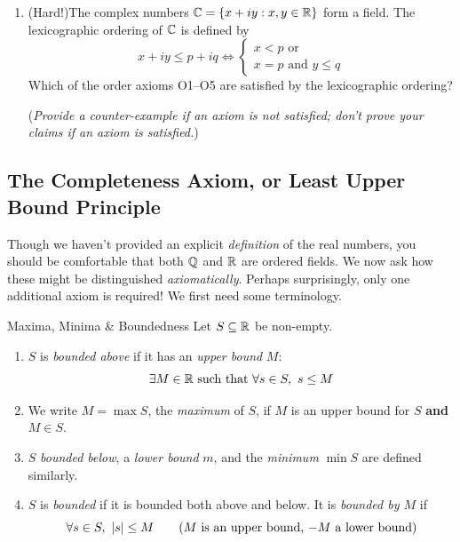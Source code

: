\begin{exercises}{}{}
\begin{enumerate}
	  
	  \item (Hard!)\lstsp The complex numbers $\mathbb{C}=\{x+iy:x,y\in\mathbb{R}\}$ form a field. The lexicographic ordering of $\mathbb{C}$ is defined by
	  \[
	  	x+iy\le p+iq\iff
	  	\begin{cases}
	  		x<p\text{ or}\\
	  		x=p\text{ and }y\le q
	  	\end{cases}
	  \]
	  Which of the order axioms O1--O5 are satisfied by the lexicographic ordering?\par
	  (\emph{Provide a counter-example if an axiom is not satisfied; don't prove your claims if an axiom is satisfied.})
	\end{enumerate}
\end{exercises}


\clearpage



\subsection[The Completeness Axiom]{The Completeness Axiom, or Least Upper Bound Principle}

Though we haven't provided an explicit \emph{definition} of the real numbers, you should be comfortable that both $\mathbb{Q}$ and $\mathbb{R}$ are ordered fields. We now ask how these might be distinguished \emph{axiomatically}. Perhaps surprisingly, only one additional axiom is required! We first need some terminology.

\begin{defn}{Maxima, Minima \& Boundedness}{}
	Let $S\subseteq\mathbb{R}$ be non-empty.
	\begin{enumerate}\itemsep0pt
		\item $S$ is \emph{bounded above} if it has an \emph{upper bound} $M$:
		\[
			\exists M\in\mathbb{R}\text{ such that }\forall s\in S,\ s\le M
		\]
		\item We write $M=\max S$, the \emph{maximum} of $S$, if $M$ is an upper bound for $S$ \textbf{and} $M\in S$.
		\item $S$ \emph{bounded below}, a \emph{lower bound} $m$, and the \emph{minimum} $\min S$ are defined similarly.
		\item $S$ is \emph{bounded} if it is bounded both above and below. It is \emph{bounded by $M$} if
		\[
			\forall s\in S,\ \left| s\right|\le M \tag{$M$ is an upper bound, $-M$ a lower bound}
		\]
	\end{enumerate}
\end{defn}


